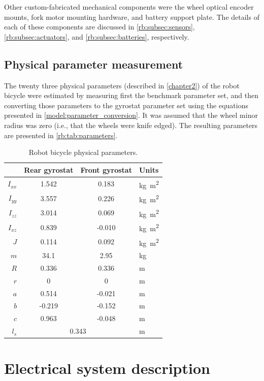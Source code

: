 Other custom-fabricated mechanical components were the wheel optical encoder
mounts, fork motor mounting hardware, and battery support plate. The details of
each of these components are discussed in \ref{rb:subsec:sensors},
\ref{rb:subsec:actuators}, and \ref{rb:subsec:batteries}, respectively.

\subsection{Physical parameter measurement} \label{rb:subsec:parameters}
The twenty three physical parameters (described in \autoref{chapter2}) of the
robot bicycle were estimated by measuring first the benchmark parameter set,
and then converting those parameters to the gyrostat parameter set using the
equations presented in \autoref{model:parameter_conversion}. It was assumed
that the wheel minor radius was zero (i.e., that the wheels were knife edged).
The resulting parameters are presented in \autoref{rb:tab:parameters}.
\begin{table}[htbp]
  \centering
  \begin{tabular}{rccl}
    \toprule
    & {Rear gyrostat} & {Front gyrostat} & {Units} \\
    \midrule
    $I_{xx}$ &  1.542 &   0.183 & \si{kg.m^2} \\
    $I_{yy}$ &  3.557 &   0.226 & \si{kg.m^2} \\
    $I_{zz}$ &  3.014 &   0.069 & \si{kg.m^2} \\
    $I_{xz}$ &  0.839 &  -0.010 & \si{kg.m^2} \\
         $J$ &  0.114 &   0.092 & \si{kg.m^2} \\
         $m$ & 34.1   &   2.95  & \si{kg}     \\
         $R$ &  0.336 &   0.336 & \si{m}      \\
         $r$ &  0     &   0     & \si{m}\\
         $a$ &  0.514 &  -0.021 & \si{m}\\
         $b$ & -0.219 &  -0.152 & \si{m}\\
         $c$ &  0.963 &  -0.048 & \si{m}\\
         $l_s$ & \multicolumn{2}{c}{0.343} &  \si{m} \\
    \bottomrule
  \end{tabular}
  \caption{Robot bicycle physical parameters.}
  \label{rb:tab:parameters}
\end{table}
\section{Electrical system description} \label{rb:sec:elec}
